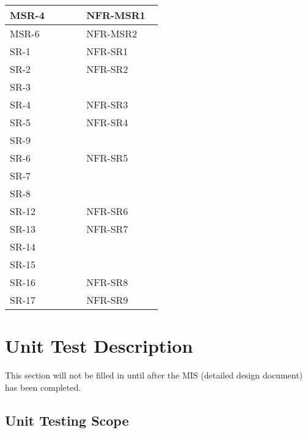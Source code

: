 \documentclass[12pt, titlepage]{article}
\begin{document}
\begin{longtable}{|p{0.45\linewidth}|p{0.45\linewidth}|}
  MSR-4 & NFR-MSR1\\
  \hline
  MSR-6 & NFR-MSR2\\
  \hline
  SR-1 & NFR-SR1\\
  \hline
  SR-2 & NFR-SR2\\
  SR-3 & \\
  \hline
  SR-4 & NFR-SR3\\
  \hline
  SR-5 & NFR-SR4\\
  SR-9 & \\
  \hline
  SR-6 & NFR-SR5\\
  SR-7 & \\
  SR-8 & \\
  \hline
  SR-12 & NFR-SR6\\
  \hline
  SR-13 & NFR-SR7\\
  SR-14 & \\
  SR-15 & \\
  \hline
  SR-16 & NFR-SR8\\
  \hline
  SR-17 & NFR-SR9\\
  \hline

\end{longtable}

\section{Unit Test Description}

This section will not be filled in until after the MIS (detailed design
document) has been completed.

\begin{comment}
\wss{Reference your MIS (detailed design document) and explain your overall
philosophy for test case selection.}  

\wss{To save space and time, it may be an option to provide less detail in this
section.  
For the unit tests you can potentially layout your testing strategy here.  That
is, you can explain how tests will be selected for each module.  For instance,
your test building approach could be test cases for each access program,
including one test for normal behaviour and as many tests as needed for edge
cases.  Rather than create the details of the input and output here, you could
point to the unit testing code.  For this to work, you code needs to be
well-documented, with meaningful names for all of the tests.} 
\end{comment}

\subsection{Unit Testing Scope}
\end{document}

